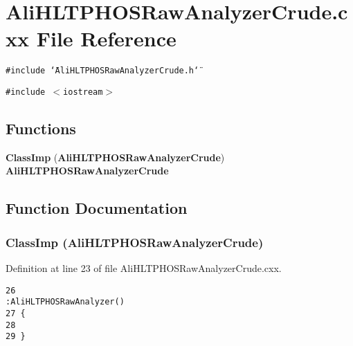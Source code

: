 \section{Ali\-HLTPHOSRaw\-Analyzer\-Crude.cxx File Reference}
\label{AliHLTPHOSRawAnalyzerCrude_8cxx}


{\tt \#include \char`\"{}Ali\-HLTPHOSRaw\-Analyzer\-Crude.h\char`\"{}}\par
{\tt \#include $<$iostream$>$}\par
\subsection*{Functions}
\begin{CompactItemize}
\item 
{\bf Class\-Imp} ({\bf Ali\-HLTPHOSRaw\-Analyzer\-Crude}) {\bf Ali\-HLTPHOSRaw\-Analyzer\-Crude}
\end{CompactItemize}


\subsection{Function Documentation}
\subsubsection{\setlength{\rightskip}{0pt plus 5cm}Class\-Imp ({\bf Ali\-HLTPHOSRaw\-Analyzer\-Crude})}\label{AliHLTPHOSRawAnalyzerCrude_8cxx_a0}




Definition at line 23 of file Ali\-HLTPHOSRaw\-Analyzer\-Crude.cxx.

\footnotesize\begin{verbatim}26                                                                                        :AliHLTPHOSRawAnalyzer()
27 {
28 
29 }
\end{verbatim}\normalsize 


